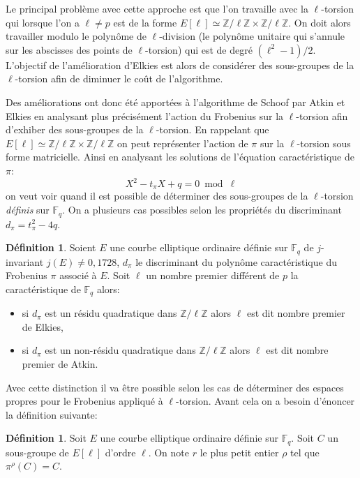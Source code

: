 \documentclass[10pt,a4paper]{book}
\theoremstyle{plain}
\theoremstyle{definition}
\theoremstyle{definition}
\theoremstyle{definition}
\theoremstyle{definition}
\newtheorem{defi}[thm]{Définition}
\theoremstyle{remark}
\theoremstyle{remark}
\theoremstyle{definition}
\begin{document}
Le principal problème avec cette approche est que l'on travaille avec la $\ell$-torsion qui lorsque l'on a $\ell \neq p$ est de la forme $E[\ell] \simeq \mathbb{Z}/\ell \mathbb{Z} \times \mathbb{Z}/\ell \mathbb{Z}$. On doit alors travailler modulo le polynôme de $\ell$-division (le polynôme unitaire qui s'annule sur les abscisses des points de $\ell$-torsion) qui est de degré $(\ell^2-1)/2$. L'objectif de l'amélioration d'Elkies est alors de considérer des sous-groupes de la $\ell$-torsion afin de diminuer le coût de l'algorithme.

Des améliorations ont donc été apportées à l'algorithme de Schoof par Atkin et Elkies en analysant plus précisément l'action du Frobenius sur la $\ell$-torsion afin d'exhiber des sous-groupes de la $\ell$-torsion. En  rappelant que $E[\ell] \simeq \mathbb{Z}/\ell \mathbb{Z} \times \mathbb{Z}/\ell \mathbb{Z}$ on peut représenter l'action de $\pi$ sur la $\ell$-torsion sous forme matricielle. Ainsi en analysant les solutions de l'équation caractéristique de $\pi$:
\begin{equation*}
X^2-t_{\pi}X+q = 0 \bmod \ell
\end{equation*} 
on veut voir quand il est possible de déterminer des sous-groupes de la $\ell$-torsion \emph{définis} sur $\mathbb{F}_q$.
On a plusieurs cas possibles selon les propriétés du discriminant $d_{\pi}=t_{\pi}^2-4q$.

\begin{defi}\label{def:dif-Atk-Elk}
Soient $E$ une courbe elliptique ordinaire définie sur $\mathbb{F}_q$ de $j$-invariant $j(E) \neq 0,1728$, $d_{\pi}$ le discriminant du polynôme caractéristique du Frobenius $\pi$ associé à $E$. Soit $\ell$ un nombre premier différent de $p$ la caractéristique de $\mathbb{F}_q$ alors:
\begin{itemize}
\item si $d_{\pi}$ est un résidu quadratique dans $\mathbb{Z}/\ell \mathbb{Z}$ alors $\ell$ est dit nombre premier de Elkies,
\item si $d_{\pi}$ est un non-résidu quadratique dans $\mathbb{Z}/\ell \mathbb{Z}$ alors $\ell$ est dit nombre premier de Atkin.
\end{itemize} 
\end{defi}
	Avec cette distinction il va être possible selon les cas de déterminer des espaces propres pour le Frobenius appliqué à $\ell$-torsion. Avant cela on a besoin d'énoncer la définition suivante:
\begin{defi}
Soit $E$ une courbe elliptique ordinaire définie sur $\mathbb{F}_q$. Soit $C$ un sous-groupe de $E[\ell]$ d'ordre $\ell$. On note $r$ le plus petit entier $\rho$ tel que $\pi^{\rho}(C)=C$.
\end{defi}	
	 
\end{document}
